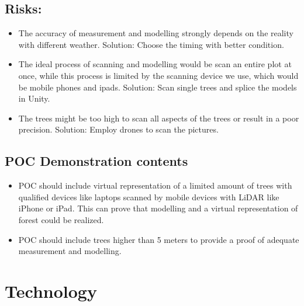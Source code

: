 \documentclass{article}
\begin{document}
\subsection{Risks:}
\begin{itemize}
    \item The accuracy of measurement and modelling strongly depends on the reality with different weather.
        Solution: Choose the timing with better condition.
        
    \item The ideal process of scanning and modelling would be scan an entire plot at once, while this process is limited by the scanning device we use, which would be mobile phones and ipads.     Solution: Scan single trees and splice the models in Unity.
    
    \item The trees might be too high to scan all aspects of the trees or result in a poor precision.
        Solution: Employ drones to scan the pictures.
\end{itemize}

\subsection{POC Demonstration contents}
\begin{itemize}
    \item POC should include virtual representation of a limited amount
    of trees with qualified devices like laptops scanned by mobile devices with LiDAR like iPhone or iPad. 
    This can prove that modelling and a virtual representation of forest could be realized.
    \item POC should include trees higher than 5 meters to provide a proof of adequate measurement and modelling. 
\end{itemize}
\section{Technology}
\end{document}
